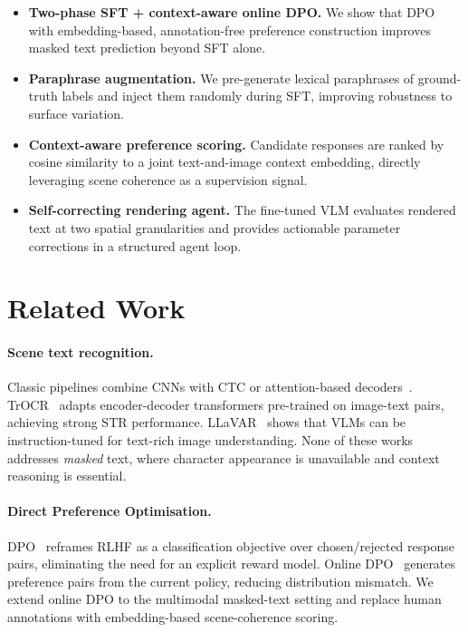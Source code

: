 \documentclass[uplatex,10pt,twocolumn,a4paper]{article}
\begin{document}
\begin{itemize}
  \item \textbf{Two-phase SFT + context-aware online DPO.}
    We show that DPO with embedding-based, annotation-free preference
    construction improves masked text prediction beyond SFT alone.

  \item \textbf{Paraphrase augmentation.}
    We pre-generate lexical paraphrases of ground-truth labels and
    inject them randomly during SFT, improving robustness to surface
    variation.

  \item \textbf{Context-aware preference scoring.}
    Candidate responses are ranked by cosine similarity to a joint
    text-and-image context embedding, directly leveraging scene
    coherence as a supervision signal.

  \item \textbf{Self-correcting rendering agent.}
    The fine-tuned VLM evaluates rendered text at two spatial
    granularities and provides actionable parameter corrections in a
    structured agent loop.
\end{itemize}

\section{Related Work}
\label{sec:related}

\paragraph{Scene text recognition.}
Classic pipelines combine CNNs with CTC or attention-based
decoders~\cite{crnn2015, aster2019, abinet2021}.
TrOCR~\cite{trocr2021} adapts encoder-decoder transformers pre-trained
on image-text pairs, achieving strong STR performance.
LLaVAR~\cite{llavar2023} shows that VLMs can be instruction-tuned for
text-rich image understanding.
None of these works addresses \emph{masked} text, where character
appearance is unavailable and context reasoning is essential.

\paragraph{Direct Preference Optimisation.}
DPO~\cite{dpo2023} reframes RLHF as a classification objective over
chosen/rejected response pairs, eliminating the need for an explicit
reward model.
Online DPO~\cite{onlinedpo2024} generates preference pairs from the
current policy, reducing distribution mismatch.
We extend online DPO to the multimodal masked-text setting and replace
human annotations with embedding-based scene-coherence scoring.
\end{document}
